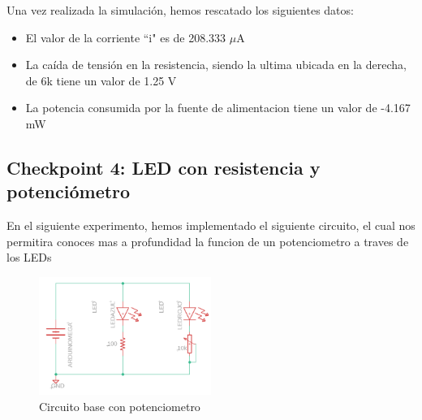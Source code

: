 \documentclass{article}
\begin{document}
Una vez realizada la simulación, hemos rescatado los siguientes datos:
\begin{itemize}
    \item El valor de la corriente ``i" es de 208.333 $\mu$A
    \item La caída de tensión en la resistencia, siendo la ultima ubicada en la derecha, de 6k tiene un valor de 1.25 V
    \item La potencia consumida por la fuente de alimentacion tiene un valor de -4.167 mW
\end{itemize}

\subsection{Checkpoint 4: LED con resistencia y potenciómetro}
En el siguiente experimento, hemos implementado el siguiente circuito, el cual nos permitira conoces mas a profundidad la funcion de un potenciometro a traves de los LEDs

\begin{figure}[H]
    \centering
    \includegraphics[width=0.50\textwidth]{./img/Circuito-potenciometro.png}
    \caption{Circuito base con potenciometro}
    \label{fig:simulacion_esquema4}
\end{figure}
\end{document}
